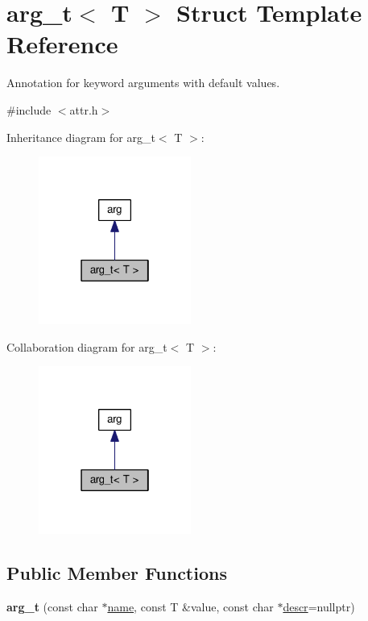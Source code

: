 \hypertarget{structarg__t}{}\section{arg\+\_\+t$<$ T $>$ Struct Template Reference}
\label{structarg__t}


Annotation for keyword arguments with default values.  




{\ttfamily \#include $<$attr.\+h$>$}



Inheritance diagram for arg\+\_\+t$<$ T $>$\+:
\nopagebreak
\begin{figure}[H]
\begin{center}
\leavevmode
\includegraphics[width=142pt]{structarg__t__inherit__graph}
\end{center}
\end{figure}


Collaboration diagram for arg\+\_\+t$<$ T $>$\+:
\nopagebreak
\begin{figure}[H]
\begin{center}
\leavevmode
\includegraphics[width=142pt]{structarg__t__coll__graph}
\end{center}
\end{figure}
\subsection*{Public Member Functions}
\begin{DoxyCompactItemize}
\item 
{\bfseries arg\+\_\+t} (const char $\ast$\hyperlink{structname}{name}, const T \&value, const char $\ast$\hyperlink{classdescr}{descr}=nullptr)\hypertarget{structarg__t_a9019c497341840799fecd688ac43ac8c}{}\label{structarg__t_a9019c497341840799fecd688ac43ac8c}

\end{DoxyCompactItemize}
